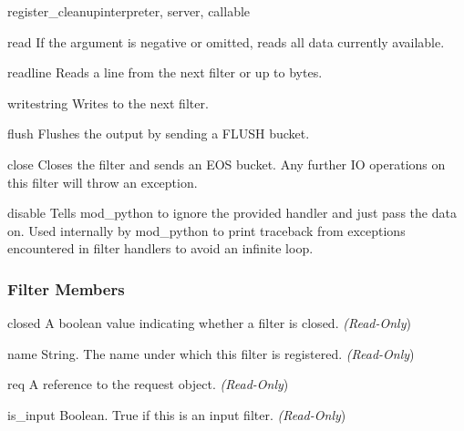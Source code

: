 \begin{funcdesc}{register_cleanup}{interpreter, server, callable}
\begin{methoddesc}[filter]{read}{}
  If the  argument is negative or omitted, reads all data
  currently available.
\end{methoddesc}

\begin{methoddesc}[filter]{readline}{}
  Reads a line from the next filter or up to  bytes.
\end{methoddesc}

\begin{methoddesc}[filter]{write}{string}
  Writes  to the next filter.
\end{methoddesc}

\begin{methoddesc}[filter]{flush}{}
  Flushes the output by sending a FLUSH bucket.
\end{methoddesc}

\begin{methoddesc}[filter]{close}{}
  Closes the filter and sends an EOS bucket. Any further IO operations on
  this filter will throw an exception.
\end{methoddesc}

\begin{methoddesc}[filter]{disable}{}
  Tells mod_python to ignore the provided handler and just pass the data
  on. Used internally by mod_python to print traceback from exceptions
  encountered in filter handlers to avoid an infinite loop.
\end{methoddesc}

\subsubsection{Filter Members\label{pyapi-mpfilt-mem}}

\begin{memberdesc}[filter]{closed}
  A boolean value indicating whether a filter is closed.
  \emph{(Read-Only})
\end{memberdesc}

\begin{memberdesc}[filter]{name}
  String. The name under which this filter is registered.
  \emph{(Read-Only})
\end{memberdesc}

\begin{memberdesc}[filter]{req}
  A reference to the request object.
  \emph{(Read-Only})
\end{memberdesc}

\begin{memberdesc}[filter]{is_input}
  Boolean. True if this is an input filter.
  \emph{(Read-Only})
\end{memberdesc}


\end{funcdesc}
